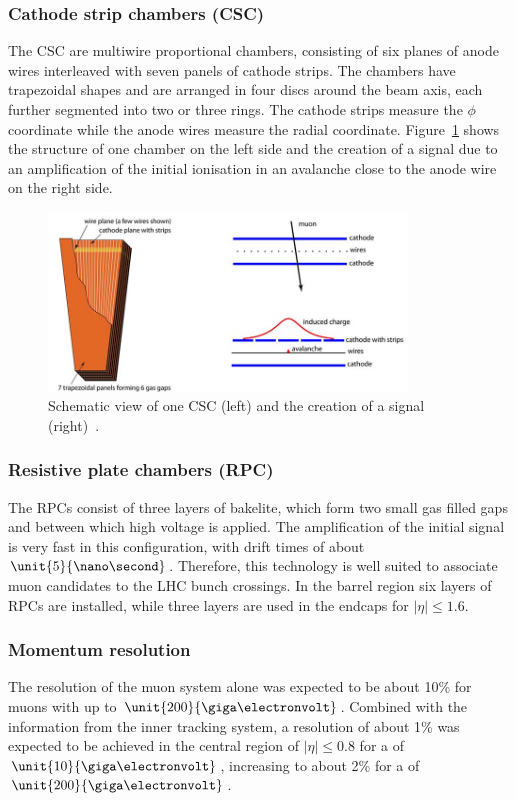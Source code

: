\subsubsection*{Cathode strip chambers (CSC)}
The CSC are multiwire proportional chambers, consisting of six planes of anode wires interleaved with seven panels of cathode strips. The chambers have trapezoidal shapes and are arranged in four discs around the beam axis, each further segmented into two or three rings. The cathode strips measure the $\phi$ coordinate while the anode wires measure the radial coordinate. Figure~\ref{fig:CSC} shows the structure of one chamber on the left side and the creation of a signal due to an amplification of the initial ionisation in an avalanche close to the anode wire on the right side. 
\begin{figure}[htbp]
\centering
  \includegraphics[width=0.85\textwidth]{plots/CMS/CSC.png}
\caption{Schematic view of one CSC (left) and the creation of a signal (right)~\cite{CMS}.}
\label{fig:CSC}
\end{figure}  
\subsubsection*{Resistive plate chambers (RPC)}
The RPCs consist of three layers of bakelite, which form two small gas filled gaps and between which high voltage is applied. The amplification of the initial signal is very fast in this configuration, with drift times of about $\unit{5}{\nano\second}$. Therefore, this technology is well suited to associate muon candidates to the LHC bunch crossings. In the barrel region six layers of RPCs are installed, while three layers are used in the endcaps for $\vert\eta\vert \leq 1.6$.
\subsubsection*{Momentum resolution}
The \pt resolution of the muon system alone was expected to be about 10\% for muons with \pt up to $\unit{200}{\giga\electronvolt}$. Combined with the information from the inner tracking system, a resolution of about 1\% was expected to be achieved in the central region of $\vert\eta\vert \leq 0.8$ for a \pt of $\unit{10}{\giga\electronvolt}$, increasing to about 2\% for a \pt of $\unit{200}{\giga\electronvolt}$.

